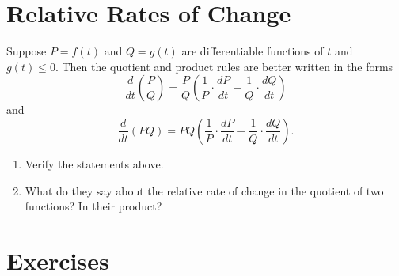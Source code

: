 \documentclass{ximera}
\begin{document}
\section{Relative Rates of Change}

Suppose $P=f(t)$ and $Q=g(t)$ are differentiable functions of $t$ and $g(t)\leq 0$. Then the quotient and product rules are better written in the forms
\begin{equation}  \label{Eq:Quotient}
   \frac{d}{dt} \left( \frac{P}{Q} \right) =  \frac{P}{Q} \left(   \frac{1}{P}\cdot \frac {dP}{dt} -  \frac{1}{Q}\cdot \frac {dQ}{dt}      \right)
\end{equation}
and
\[
   \frac{d}{dt} \left( PQ \right) =  PQ \left(   \frac{1}{P}\cdot \frac {dP}{dt} + \frac{1}{Q}\cdot \frac {dQ}{dt}      \right) .
\]

\begin{question} \label{Qgbhere}
\begin{enumerate}
\item Verify the statements above.

\item What do they say about the relative rate of change in the quotient of two functions? In their product?
\end{enumerate}
\end{question}

\section{Exercises}
\end{document}
